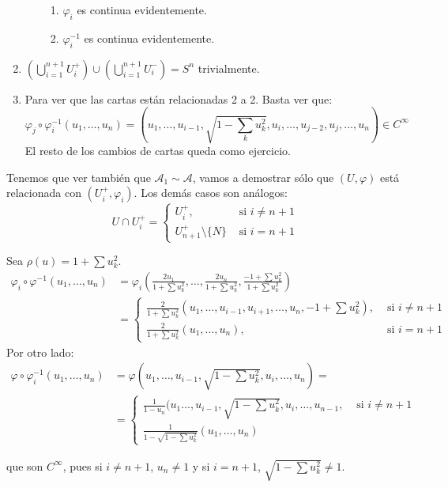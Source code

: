 \documentclass[twoside]{article}
\newcommand{\A}{{\mathcal{A}}}
\begin{document}
\begin{solucion}
\begin{enumerate}
\begin{enumerate}
\begin{enumerate}
			\item $φ_i$ es continua evidentemente.
			\item $φ_i^{-1}$ es continua evidentemente.
		\end{enumerate}
	\end{enumerate}
	\item $(\bigcup_{i=1}^{n+1} U_i^+) \cup (\bigcup_{i=1}^{n+1} U_i^-) = S^n$ trivialmente.
	\item Para ver que las cartas están relacionadas 2 a 2. Basta ver que:
		\[ φ_j \circ φ_i^{-1} (u_1,\dots,u_n) = (u_1,\dots,u_{i-1},\sqrt{1-\sum_k u_k^2}, u_i,\dots,u_{j-2},u_j,\dots,u_n) \in C^{∞} \]
		El resto de los cambios de cartas queda como ejercicio.
	\end{enumerate}
	Tenemos que ver también que $\A_1 \sim \A$, vamos a demostrar sólo que $(U,φ)$ está relacionada con $(U_i^+,φ_i)$. Los demás casos son análogos:
	\[ U \cap U_i^+ = \begin{cases}
	U_i^+, &\text{ si }i \neq n+1\\
	U_{n+1}^+ \setminus \{N\} &\text{ si }i = n+1
\end{cases}\]

Sea $ρ(u)=1+\sum u_k^2$.
\begin{align*}
	φ_i \circ φ^{-1} (u_1,\dots,u_n) & = φ_i\left(\frac{2u_1}{1+\sum u_k^2}, \dots, \frac{2u_n}{1+\sum u_k^2}, \frac{-1+\sum u_k^2}{1+\sum u_k^2}\right)\\
	& = \begin{cases}
	\frac{2}{1+\sum u_k^2}(u_1, \dots, u_{i-1},u_{i+1},\dots,u_n, -1+\sum u_k^2), &\text{ si }i \neq n+1 \\
	\frac{2}{1+\sum u_k^2}(u_1, \dots,u_n), &\text{ si }i = n+1
\end{cases}
\end{align*}
Por otro lado:
\begin{align*}
	φ \circ φ_i^{-1}(u_1,\dots,u_n) & = φ(u_1,\dots,u_{i-1},\sqrt{1-\sum u_k^2},u_i,\dots,u_n) =\\
	& = \begin{cases}
	\frac{1}{1-u_n}(u_1\dots,u_{i-1},\sqrt{1-\sum u_k^2},u_i,\dots,u_{n-1}, &\text{ si }i \neq n+1\\
	\frac{1}{1-\sqrt{1-\sum u_k^2}}(u_1,\dots,u_n)
\end{cases}
\end{align*}

que son $C^{∞}$, pues si $i \neq n+1$, $u_n \neq 1$ y si $i = n+1$, $\sqrt{1-\sum u_k^2} \neq 1$.

\end{solucion}
\end{document}
